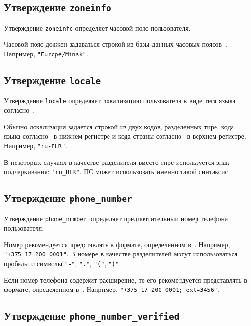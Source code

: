 \subsection{Утверждение \lstinline{zoneinfo}}\label{CLAIMS.ZoneInfo}

Утверждение \lstinline{zoneinfo} определяет часовой пояс пользователя.

Часовой пояс должен задаваться строкой из базы данных часовых 
поясов~\cite{RFC6557}. Например, \lstinline{"Europe/Minsk"}.

\subsection{Утверждение \lstinline{locale}}\label{CLAIMS.Locale}

Утверждение \lstinline{locale} определяет локализацию пользователя
в виде тега языка согласно~\cite{RFC5646}.

Обычно локализация задается строкой из двух кодов, разделенных тире: 
кода языка согласно~\cite{ISO639-1} в нижнем регистре и кода страны 
согласно~\cite{ISO3166-1} в верхнем регистре.
%
Например, \lstinline{"ru-BLR"}. 

В некоторых случаях в качестве разделителя вместо тире используется знак 
подчеркивания: \lstinline{"ru_BLR"}. ПС может использовать именно такой 
синтаксис.

\subsection{Утверждение \lstinline{phone_number}}\label{CLAIMS.PhoneNumber}

Утверждение \lstinline{phone_number} определяет предпочтительный номер телефона 
пользователя.

Номер рекомендуется представлять в формате, определенном в~\cite{E-164}. 
Например, \lstinline{"+375 17 200 0001"}. 
%
В номере в качестве разделителей могут использоваться пробелы и символы
\lstinline{"-"}, \lstinline{"."}, \lstinline{"("}, \lstinline{")"}.

Если номер телефона содержит расширение, то его рекомендуется
представлять в формате, определенном в~\cite{RFC3966}.
%
Например, \lstinline{"+375 17 200 0001; ext=3456"}.
%

\subsection{Утверждение \lstinline{phone_number_verified}}
\label{CLAIMS.PhoneNumberVerified}

